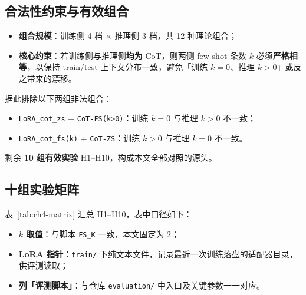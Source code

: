 \subsection{合法性约束与有效组合}
\begin{itemize}
    \item \textbf{组合规模}：训练侧 4 档 $\times$ 推理侧 3 档，共 12 种理论组合；
    \item \textbf{核心约束}：若训练侧与推理侧\textbf{均为} CoT，则两侧 few-shot 条数 $k$ 必须\textbf{严格相等}，以保持 train/test 上下文分布一致，避免「训练 $k{=}0$、推理 $k{>}0$」或反之带来的漂移。
\end{itemize}
据此排除以下两组非法组合：
\begin{itemize}
    \item \texttt{LoRA\_cot\_zs} + \texttt{CoT-FS(k>0)}：训练 $k{=}0$ 与推理 $k{>}0$ 不一致；
    \item \texttt{LoRA\_cot\_fs(k)} + \texttt{CoT-ZS}：训练 $k{>}0$ 与推理 $k{=}0$ 不一致。
\end{itemize}
剩余 \textbf{10 组有效实验} H1--H10，构成本文全部对照的源头。

\subsection{十组实验矩阵}
表~\ref{tab:ch4-matrix} 汇总 H1--H10，表中口径如下：
\begin{itemize}
    \item \textbf{$k$ 取值}：与脚本 \texttt{FS\_K} 一致，本文固定为 $2$；
    \item \textbf{LoRA 指针}：\texttt{train/} 下纯文本文件，记录最近一次训练落盘的适配器目录，供评测读取；
    \item \textbf{列「评测脚本」}：与仓库 \texttt{evaluation/} 中入口及关键参数一一对应。
\end{itemize}

